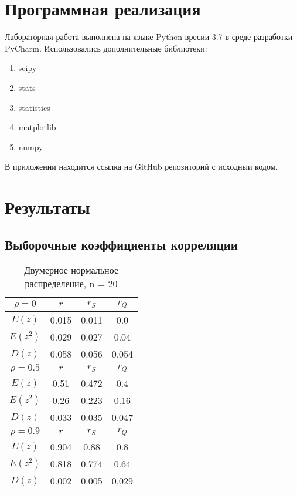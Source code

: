 \documentclass{article}
\begin{document}
\section{Программная реализация}
\noindent Лабораторная работа выполнена на языке Python вресии 3.7 в среде разработки PyCharm. Использовались дополнительные библиотеки:
 \begin{enumerate}
        \item scipy
        \item stats
        \item statistics
        \item matplotlib 
        \item numpy 
    \end{enumerate}
В приложении находится ссылка на GitHub репозиторий с исходныи кодом.

\section{Результаты}
\subsection{Выборочные коэффициенты корреляции}
	\begin{table}[H]
		\centering
		\begin{tabular}{| c | c | c | c |}
			
			\hline
			$\rho=0$  & $r$      & $r_S$  & $r_Q$ \\
			\hline
            $E(z)$    & 0.015 & 0.011 & 0.0   \\
            $E(z^{2})$ & 0.029 & 0.027 & 0.04  \\
            $D(z)$   & 0.058 & 0.056 & 0.054 \\
			\hline
			$\rho=0.5$ & $r$      & $r_S$  & $r_Q$ \\
			\hline
			$E(z)$     & 0.51  & 0.472 & 0.4   \\
            $E(z^{2})$  & 0.26  & 0.223 & 0.16  \\
            $D(z)$      & 0.033 & 0.035 & 0.047 \\
			\hline
			$\rho=0.9$  & $r$      & $r_S$  & $r_Q$ \\
			\hline
			$E(z)$       & 0.904 & 0.88  & 0.8   \\ 
            $E(z^{2})$   & 0.818 & 0.774 & 0.64  \\
            $D(z)$      & 0.002 & 0.005 & 0.029 \\
			\hline
			
		\end{tabular}{}
		\caption{Двумерное нормальное распределение, n = 20}
		\label{tab:n20}
	\end{table}
	
\end{document}
